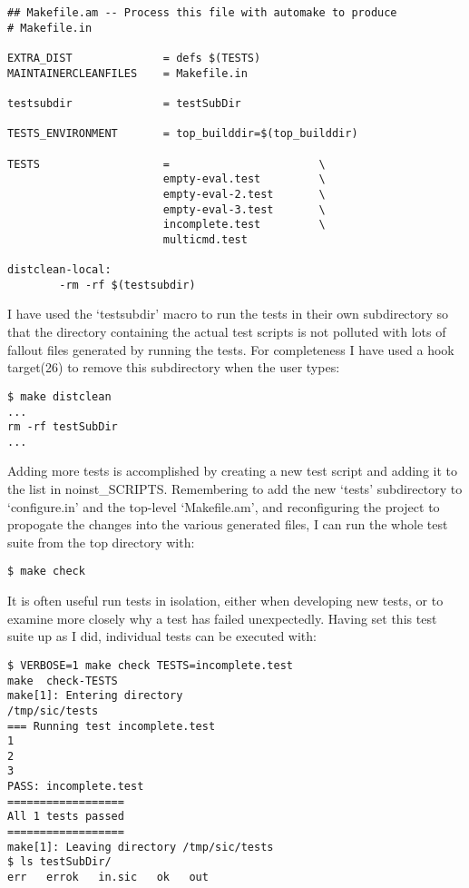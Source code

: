\begin{Verbatim}[frame=single]
## Makefile.am -- Process this file with automake to produce 
# Makefile.in

EXTRA_DIST              = defs $(TESTS)
MAINTAINERCLEANFILES    = Makefile.in

testsubdir              = testSubDir

TESTS_ENVIRONMENT       = top_builddir=$(top_builddir)

TESTS                   =                       \
                        empty-eval.test         \
                        empty-eval-2.test       \
                        empty-eval-3.test       \
                        incomplete.test         \
                        multicmd.test

distclean-local:
        -rm -rf $(testsubdir)
\end{Verbatim}

I have used the `testsubdir' macro to run the tests in their own subdirectory so that the directory containing the actual test scripts is not polluted with lots of fallout files generated by running the tests. For completeness I have used a hook target(26) to remove this subdirectory when the user types:

\begin{Verbatim}[frame=single]
$ make distclean
...
rm -rf testSubDir
...
\end{Verbatim}

Adding more tests is accomplished by creating a new test script and adding it to the list in noinst\_{}SCRIPTS. Remembering to add the new `tests' subdirectory to `configure.in' and the top-level `Makefile.am', and reconfiguring the project to propogate the changes into the various generated files, I can run the whole test suite from the top directory with:

\begin{Verbatim}[frame=single]
$ make check
\end{Verbatim}

It is often useful run tests in isolation, either when developing new tests, or to examine more closely why a test has failed unexpectedly. Having set this test suite up as I did, individual tests can be executed with:

\begin{Verbatim}[frame=single]
$ VERBOSE=1 make check TESTS=incomplete.test
make  check-TESTS
make[1]: Entering directory
/tmp/sic/tests
=== Running test incomplete.test
1
2
3
PASS: incomplete.test
==================
All 1 tests passed
==================
make[1]: Leaving directory /tmp/sic/tests
$ ls testSubDir/
err   errok   in.sic   ok   out
\end{Verbatim}

